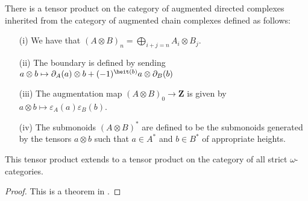 There is a tensor product on the category of augmented directed complexes inherited from the category of augmented chain complexes defined as follows:
\begin{enumerate}
\item[(i)] We have that \((A\otimes B)_n = \bigoplus_{i+j=n} A_i \otimes B_j\).  
\item[(ii)] The boundary is defined by sending \(a\otimes b \mapsto \partial_A(a)\otimes b + (-1)^{\heit(b)} a\otimes \partial_B(b)\)
\item[(iii)] The augmentation map \((A\otimes B)_0\to \mathbf{Z}\) is given by \(a\otimes b \mapsto \varepsilon_A(a)\varepsilon_B(b)\).
\item[(iv)] The submonoids \((A\otimes B)^\ast\) are defined to be the submonoids generated by the tensors \(a\otimes b\) such that \(a\in A^\ast\) and \(b\in B^\ast\) of appropriate heights.  
\end{enumerate}
\begin{thm} This tensor product extends to a tensor product on the category of all strict \(\omega\)-categories.
\end{thm}
\begin{proof} This is a theorem in \cite{steinerchain}.  
\end{proof}  